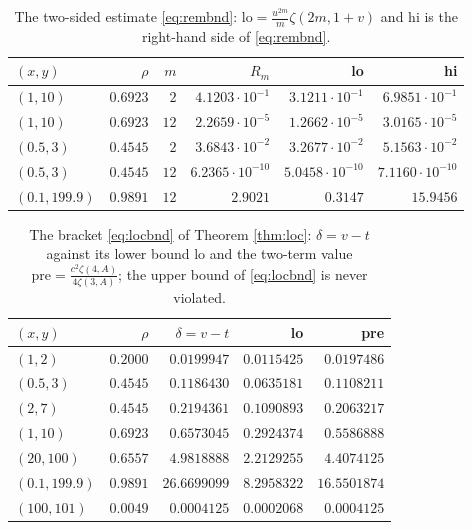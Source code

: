 \begin{table}[htbp]\centering\small
\caption{The two-sided estimate \eqref{eq:rembnd}: $\mathrm{lo}=\frac{u^{2m}}{m}\zeta(2m,1+v)$
and $\mathrm{hi}$ is the right-hand side of \eqref{eq:rembnd}.}
\label{tab:rem}
\begin{tabular}{lrrrrr}
\toprule
$(x,y)$ & $\rho$ & $m$ & $R_m$ & lo & hi\\
\midrule
$(1,10)$ & $0.6923$ & $2$ & $4.1203\cdot10^{-1}$ & $3.1211\cdot10^{-1}$ & $6.9851\cdot10^{-1}$\\
$(1,10)$ & $0.6923$ & $12$ & $2.2659\cdot10^{-5}$ & $1.2662\cdot10^{-5}$ & $3.0165\cdot10^{-5}$\\
$(0.5,3)$ & $0.4545$ & $2$ & $3.6843\cdot10^{-2}$ & $3.2677\cdot10^{-2}$ & $5.1563\cdot10^{-2}$\\
$(0.5,3)$ & $0.4545$ & $12$ & $6.2365\cdot10^{-10}$ & $5.0458\cdot10^{-10}$ & $7.1160\cdot10^{-10}$\\
$(0.1,199.9)$ & $0.9891$ & $12$ & $2.9021$ & $0.3147$ & $15.9456$\\
\bottomrule
\end{tabular}
\end{table}

\begin{table}[htbp]\centering\small
\caption{The bracket \eqref{eq:locbnd} of Theorem \ref{thm:loc}: $\delta=v-t$ against its
lower bound $\mathrm{lo}$ and the two-term value
$\mathrm{pre}=\frac{c^{2}\zeta(4,A)}{4\zeta(3,A)}$; the upper bound of \eqref{eq:locbnd} is
never violated.}
\label{tab:brk}
\begin{tabular}{lrrrr}
\toprule
$(x,y)$ & $\rho$ & $\delta=v-t$ & lo & pre\\
\midrule
$(1,2)$ & $0.2000$ & $0.0199947$ & $0.0115425$ & $0.0197486$\\
$(0.5,3)$ & $0.4545$ & $0.1186430$ & $0.0635181$ & $0.1108211$\\
$(2,7)$ & $0.4545$ & $0.2194361$ & $0.1090893$ & $0.2063217$\\
$(1,10)$ & $0.6923$ & $0.6573045$ & $0.2924374$ & $0.5586888$\\
$(20,100)$ & $0.6557$ & $4.9818888$ & $2.2129255$ & $4.4074125$\\
$(0.1,199.9)$ & $0.9891$ & $26.6699099$ & $8.2958322$ & $16.5501874$\\
$(100,101)$ & $0.0049$ & $0.0004125$ & $0.0002068$ & $0.0004125$\\
\bottomrule
\end{tabular}
\end{table}


